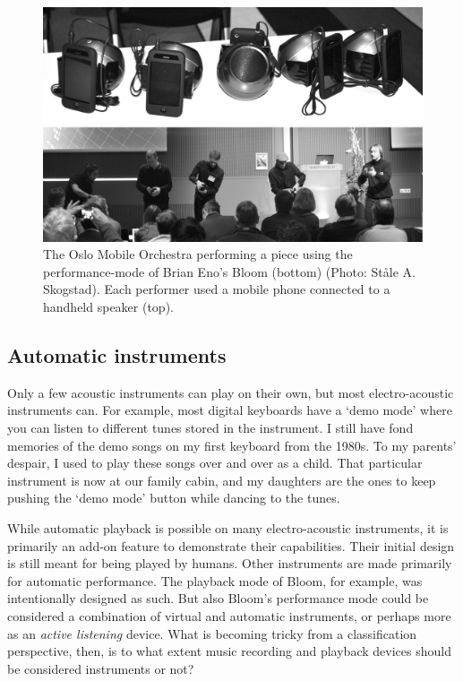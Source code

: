 \begin{figure}[tbp]
	\includegraphics[width=1\columnwidth]{figures/52-mobile-orchestra.jpg}
			\caption{The Oslo Mobile Orchestra performing a piece using the performance-mode of Brian Eno's Bloom (bottom) (Photo: Ståle A. Skogstad). Each performer used a mobile phone connected to a handheld speaker (top).}
			\label{fig:olo-verdikt}
\end{figure}

\subsection{Automatic instruments}

Only a few acoustic instruments can play on their own, but most electro-acoustic instruments can. For example, most digital keyboards have a `demo mode' where you can listen to different tunes stored in the instrument. I still have fond memories of the demo songs on my first keyboard from the 1980s. To my parents' despair, I used to play these songs over and over as a child. That particular instrument is now at our family cabin, and my daughters are the ones to keep pushing the `demo mode' button while dancing to the tunes.

While automatic playback is possible on many electro-acoustic instruments, it is primarily an add-on feature to demonstrate their capabilities. Their initial design is still meant for being played by humans. Other instruments are made primarily for automatic performance. The playback mode of Bloom, for example, was intentionally designed as such. But also Bloom's performance mode could be considered a combination of virtual and automatic instruments, or perhaps more as an \emph{active listening} device. What is becoming tricky from a classification perspective, then, is to what extent music recording and playback devices should be considered instruments or not?

